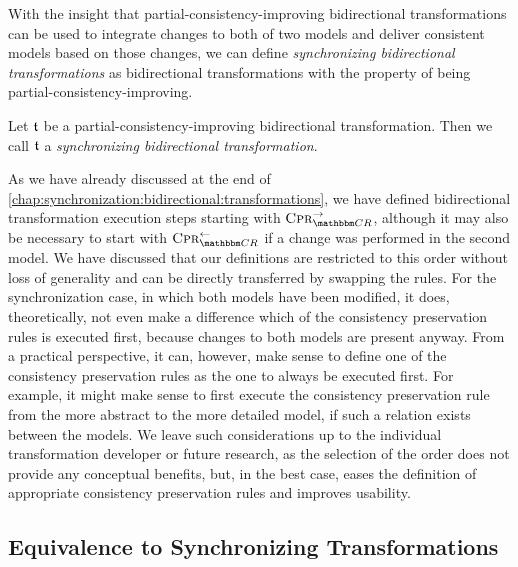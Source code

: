 With the insight that partial-consistency-improving bidirectional transformations can be used to integrate changes to both of two models and deliver consistent models based on those changes, we can define \emph{synchronizing bidirectional transformations} as bidirectional transformations with the property of being partial-consistency-improving.

\begin{definition}
    Let $\transformation{t}$ be a partial-consistency-improving bidirectional transformation.
    Then we call $\transformation{t}$ a \emph{synchronizing bidirectional transformation}.
\end{definition}

As we have already discussed at the end of \autoref{chap:synchronization:bidirectional:transformations}, we have defined bidirectional transformation execution steps starting with $\consistencypreservationrule{\consistencyrelationset{CR}}^{\rightarrow}$, although it may also be necessary to start with $\consistencypreservationrule{\consistencyrelationset{CR}}^{\leftarrow}$ if a change was performed in the second model.
We have discussed that our definitions are restricted to this order without loss of generality and can be directly transferred by swapping the rules.
For the synchronization case, in which both models have been modified, it does, theoretically, not even make a difference which of the consistency preservation rules is executed first, because changes to both models are present anyway.
From a practical perspective, it can, however, make sense to define one of the consistency preservation rules as the one to always be executed first.
For example, it might make sense to first execute the consistency preservation rule from the more abstract to the more detailed model, if such a relation exists between the models.
We leave such considerations up to the individual transformation developer or future research, as the selection of the order does not provide any conceptual benefits, but, in the best case, eases the definition of appropriate consistency preservation rules and improves usability.


\subsection{Equivalence to Synchronizing Transformations}

